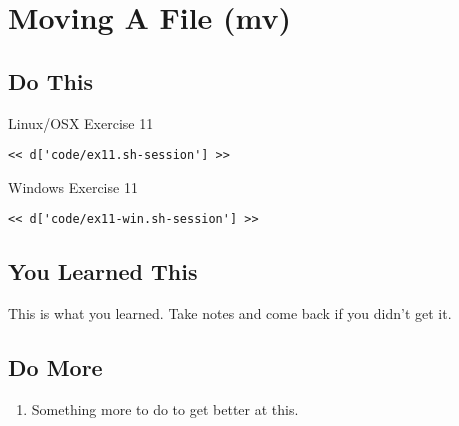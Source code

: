 \chapter{Moving A File (mv)}

\section{Do This}

\begin{code}{Linux/OSX Exercise 11}
\begin{Verbatim}
<< d['code/ex11.sh-session'] >>
\end{Verbatim}
\end{code}

\begin{code}{Windows Exercise 11}
\begin{Verbatim}
<< d['code/ex11-win.sh-session'] >>
\end{Verbatim}
\end{code}

\section{You Learned This}

This is what you learned.  Take notes and come back if you didn't get it.

\section{Do More}

\begin{enumerate}
\item Something more to do to get better at this.
\end{enumerate}

